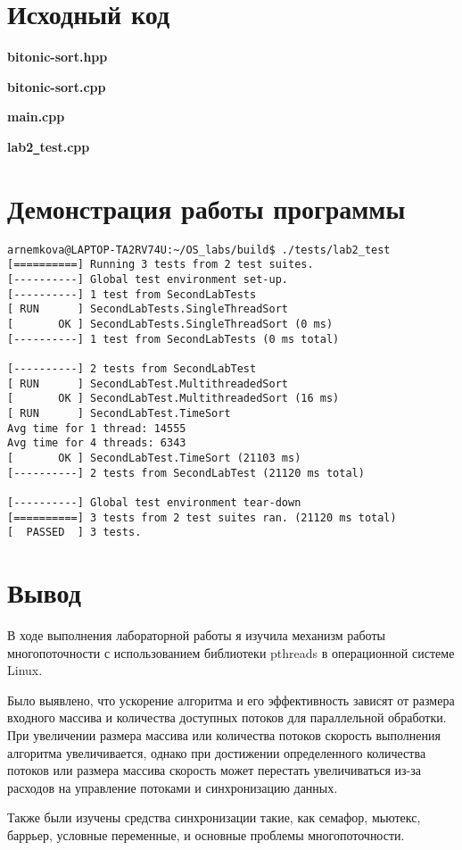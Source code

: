 \documentclass[a4paper, 14pt]{article}
\begin{document}
\section*{Исходный код}

\textbf{bitonic-sort.hpp}


\textbf{bitonic-sort.cpp}


\textbf{main.cpp}


\textbf{lab2\texttt{\_}test.cpp}

\newpage

\section*{Демонстрация работы программы}
\begin{verbatim}
arnemkova@LAPTOP-TA2RV74U:~/OS_labs/build$ ./tests/lab2_test
[==========] Running 3 tests from 2 test suites.
[----------] Global test environment set-up.
[----------] 1 test from SecondLabTests
[ RUN      ] SecondLabTests.SingleThreadSort
[       OK ] SecondLabTests.SingleThreadSort (0 ms)
[----------] 1 test from SecondLabTests (0 ms total)

[----------] 2 tests from SecondLabTest
[ RUN      ] SecondLabTest.MultithreadedSort
[       OK ] SecondLabTest.MultithreadedSort (16 ms)
[ RUN      ] SecondLabTest.TimeSort
Avg time for 1 thread: 14555
Avg time for 4 threads: 6343
[       OK ] SecondLabTest.TimeSort (21103 ms)
[----------] 2 tests from SecondLabTest (21120 ms total)

[----------] Global test environment tear-down
[==========] 3 tests from 2 test suites ran. (21120 ms total)
[  PASSED  ] 3 tests.
\end{verbatim}

\section*{Вывод}

В ходе выполнения лабораторной работы я изучила механизм работы многопоточности с использованием библиотеки pthreads в операционной системе Linux. 

Было выявлено, что ускорение алгоритма и его эффективность зависят от размера входного массива и количества доступных потоков для параллельной обработки. При увеличении размера массива или количества потоков скорость выполнения алгоритма увеличивается, однако при достижении определенного количества потоков или размера массива скорость может перестать увеличиваться из-за расходов на управление потоками и синхронизацию данных.

Также были изучены средства синхронизации такие, как семафор, мьютекс, баррьер, условные переменные, и основные проблемы многопоточности.
\end{document}

